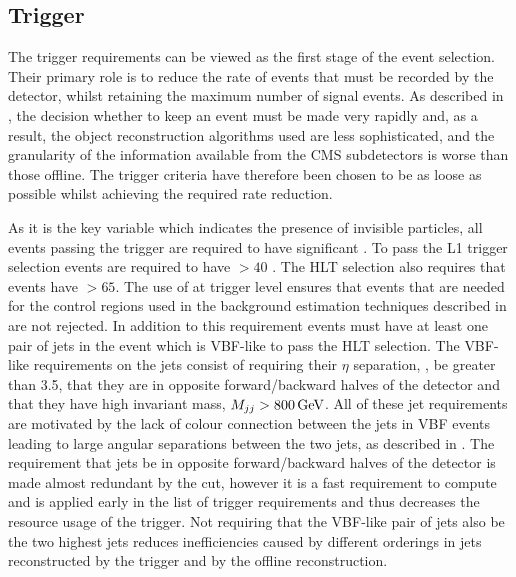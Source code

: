\subsection{Trigger}
\label{sec:prompttrig}
The trigger requirements can be viewed as the first stage of the event selection. Their primary role is to reduce the rate of events that must be recorded by the detector, whilst retaining the maximum number of signal events. As described in , the decision whether to keep an event must be made very rapidly and, as a result, the object reconstruction algorithms used are less sophisticated, and the granularity of the information available from the CMS subdetectors is worse than those offline. The trigger criteria have therefore been chosen to be as loose as possible whilst achieving the required rate reduction.

As it is the key variable which indicates the presence of invisible particles, all events passing the trigger are required to have significant \MET. To pass the \ac{L1} trigger selection events are required to have \MET$>40$ \GeV. The \ac{HLT} selection also requires that events have \METnoMU$>65$\GeV. The use of \METnoMU at trigger level ensures that events that are needed for the control regions used in the background estimation techniques described in  are not rejected. In addition to this \METnoMU requirement events must have at least one pair of jets in the event which is \ac{VBF}-like to pass the \ac{HLT} selection. The \ac{VBF}-like requirements on the jets consist of requiring their $\eta$ separation, \detajj, be greater than 3.5, that they are in opposite forward/backward halves of the detector and that they have high invariant mass, $M_{jj}>800 \,\text{Ge\hspace{-.08em}V}$. All of these jet requirements are motivated by the lack of colour connection between the jets in \ac{VBF} events leading to large angular separations between the two jets, as described in . The requirement that jets be in opposite forward/backward halves of the detector is made almost redundant by the \detajj cut, however it is a fast requirement to compute and is applied early in the list of trigger requirements and thus decreases the resource usage of the trigger. Not requiring that the \ac{VBF}-like pair of jets also be the two highest \pt jets reduces inefficiencies caused by different \pt orderings in jets reconstructed by the trigger and by the offline reconstruction.

